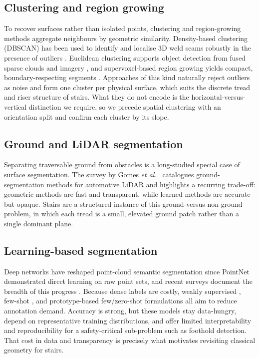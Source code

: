 \subsection{Clustering and region growing}
To recover surfaces rather than isolated points, clustering and
region-growing methods aggregate neighbours by geometric similarity.
Density-based clustering (DBSCAN) has been used to identify and localise
3D weld seams robustly in the presence of outliers
\cite{zhou2024identification}. Euclidean clustering supports object
detection from fused sparse clouds and imagery \cite{xu2021object}, and
supervoxel-based region growing yields compact, boundary-respecting
segments \cite{luo2021supervoxel}. Approaches of this kind naturally
reject outliers as noise and form one cluster per physical surface, which
suits the discrete tread and riser structure of stairs. What they do not
encode is the horizontal-versus-vertical distinction we require, so we
precede spatial clustering with an orientation split and confirm each
cluster by its slope.

\subsection{Ground and LiDAR segmentation}
Separating traversable ground from obstacles is a long-studied special
case of surface segmentation. The survey by Gomes \emph{et al.}\
\cite{gomes2023survey} catalogues ground-segmentation methods for
automotive LiDAR and highlights a recurring trade-off: geometric methods
are fast and transparent, while learned methods are accurate but opaque.
Stairs are a structured instance of this ground-versus-non-ground
problem, in which each tread is a small, elevated ground patch rather
than a single dominant plane.

\subsection{Learning-based segmentation}
Deep networks have reshaped point-cloud semantic segmentation since
PointNet \cite{qi2016pointnet} demonstrated direct learning on raw point
sets, and recent surveys document the breadth of this progress
\cite{sarker2024comprehensive}. Because dense labels are costly, weakly
supervised \cite{li2022hybridcr}, few-shot \cite{zhao2020few}, and
prototype-based few/zero-shot \cite{he2023prototype} formulations all aim
to reduce annotation demand. Accuracy is strong, but these models stay
data-hungry, depend on representative training distributions, and offer
limited interpretability and reproducibility for a safety-critical
sub-problem such as foothold detection. That cost in data and
transparency is precisely what motivates revisiting classical geometry
for stairs.

